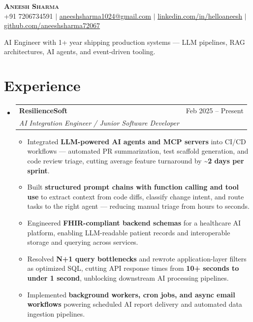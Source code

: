 \documentclass[letterpaper,11pt]{article}
\makeatletter
\newcommand{\resumeItem}[1]{
  \item\small{#1}
}
\newcommand{\resumeSubheading}[4]{
  \vspace{3pt}\item
    \begin{tabular*}{0.97\textwidth}[t]{l@{\extracolsep{\fill}}r}
      \textbf{#1} & \small #2 \\
      \textit{\small#3} & \textit{\small #4} \\
    \end{tabular*}\vspace{1pt}
}
\newcommand{\resumeSubHeadingListStart}{\begin{itemize}[leftmargin=0.15in, label={}, itemsep=1pt, parsep=0pt]}
\newcommand{\resumeSubHeadingListEnd}{\end{itemize}\vspace{1pt}}
\newcommand{\resumeItemListStart}{\begin{itemize}[itemsep=1pt, parsep=0pt, topsep=1pt]}
\newcommand{\resumeItemListEnd}{\end{itemize}\vspace{1pt}}
\makeatother
\begin{document}
\begin{center}
    \textbf{\Large \scshape Aneesh Sharma} \\ \vspace{5pt}
    \small +91 7206734591 $|$
    \href{mailto:aneeshsharma1024@gmail.com}{\underline{aneeshsharma1024@gmail.com}} $|$
    \href{https://linkedin.com/in/helloaneesh}{\underline{linkedin.com/in/helloaneesh}} $|$
    \href{https://github.com/aneeshsharma72067}{\underline{github.com/aneeshsharma72067}}
\end{center}

\vspace{-6pt}
\begin{center}
\small AI Engineer with 1+ year shipping production systems --- LLM pipelines, RAG architectures, AI agents, and event-driven tooling.
\end{center}
\vspace{-6pt}

\section{Experience}
  \resumeSubHeadingListStart
    \resumeSubheading
      {ResilienceSoft}{Feb 2025 -- Present}
      {AI Integration Engineer / Junior Software Developer}{}
    \resumeItemListStart
      \resumeItem{Integrated \textbf{LLM-powered AI agents and MCP servers} into CI/CD workflows --- automated PR summarization, test scaffold generation, and code review triage, cutting average feature turnaround by \textbf{\textasciitilde2 days per sprint}.}
      \resumeItem{Built \textbf{structured prompt chains with function calling and tool use} to extract context from code diffs, classify change intent, and route tasks to the right agent --- reducing manual triage from hours to seconds.}
      \resumeItem{Engineered \textbf{FHIR-compliant backend schemas} for a healthcare AI platform, enabling LLM-readable patient records and interoperable storage and querying across services.}
      \resumeItem{Resolved \textbf{N+1 query bottlenecks} and rewrote application-layer filters as optimized SQL, cutting API response times from \textbf{10+ seconds to under 1 second}, unblocking downstream AI processing pipelines.}
      \resumeItem{Implemented \textbf{background workers, cron jobs, and async email workflows} powering scheduled AI report delivery and automated data ingestion pipelines.}
    \resumeItemListEnd
  \resumeSubHeadingListEnd
\end{document}

